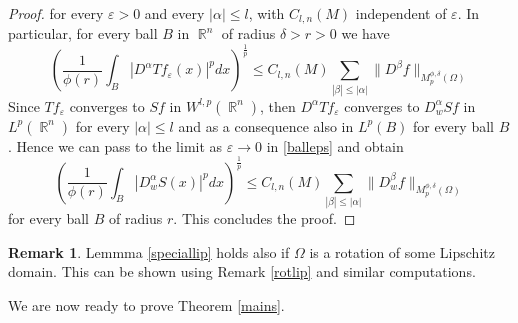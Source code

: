 \documentclass[12pt]{article}
\theoremstyle{definition}
\newtheorem{remark}{Remark}
\DeclareMathOperator\rr{\mathbb{R}}
\begin{document}
\begin{proof}
for every $\varepsilon>0$ and every $|\alpha|\le l$, with $C_{l,n}(M)$ independent of $\varepsilon$. In particular, for every ball $B$ in $\rr^n$ of radius $\delta>r>0$ we have
\begin{equation}
\left( \frac{1}{\phi(r)}\int_B |D^\alpha Tf_\varepsilon(x)|^p dx \right)^\frac{1}{p} \le C_{l,n}(M)\sum_{|\beta|\le |\alpha|}\|D^\beta f \|_{M_p^{\phi,\delta}(\Omega)} \label{balleps}
\end{equation}
Since $ Tf_\varepsilon$ converges to $Sf$ in $W^{l,p}(\rr^n)$, then  $D^\alpha Tf_\varepsilon$ converges to $D^\alpha_w Sf$ in $L^p(\rr^n)$ for every $|\alpha|\le l$ and as a consequence also in $L^p(B)$ for every ball $B$. Hence we can pass to the limit as $\varepsilon \to 0$ in \eqref{balleps} and obtain
\[\left( \frac{1}{\phi(r)}\int_B |D^\alpha_w S(x)|^p dx \right)^\frac{1}{p} \le C_{l,n}(M)\sum_{|\beta|\le |\alpha|}\|D^\beta_w f \|_{M_p^{\phi,\delta}(\Omega)} \]
for every ball $B$ of radius $r.$ This concludes the proof.
 \end{proof} 


\begin{remark}
Lemmma \ref{speciallip} holds also if $\Omega$ is a rotation of some Lipschitz domain. This can be shown using Remark \ref{rotlip} and similar computations.
\end{remark}

We are now ready to prove Theorem \ref{mains}. 
\end{document}
